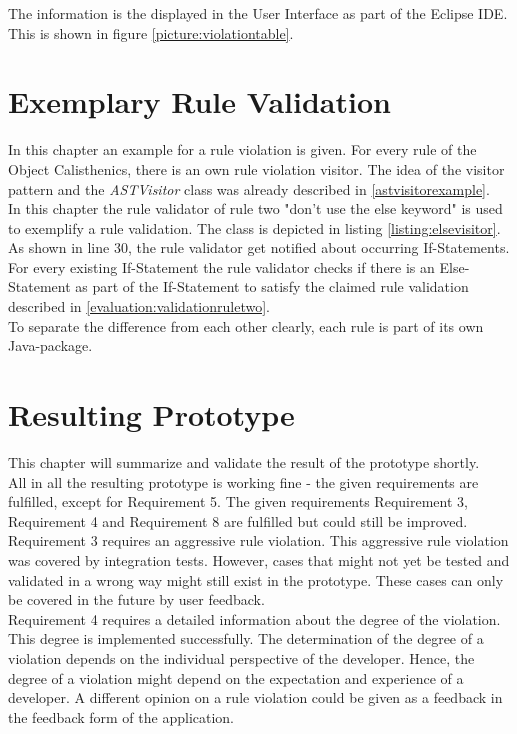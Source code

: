 The information is the displayed in the User Interface as part of the Eclipse \ac{IDE}. This is shown in figure \ref{picture:violationtable}.

\section{Exemplary Rule Validation}
\label{p:example}
In this chapter an example for a rule violation is given. For every rule of the Object Calisthenics, there is an own rule violation visitor. The idea of the visitor pattern and the \textit{ASTVisitor} class was already described in \ref{astvisitorexample}. 
\\

In this chapter the rule validator of rule two "don't use the else keyword" is used to exemplify a rule validation. The class is depicted in listing \ref{listing:elsevisitor}.
\\

As shown in line 30, the rule validator get notified about occurring If-Statements. For every existing If-Statement the rule validator checks if there is an Else-Statement as part of the If-Statement to satisfy the claimed rule validation described in \ref{evaluation:validationruletwo}. 
\\

To separate the difference from each other clearly, each rule is part of its own Java-package. 

\section{Resulting Prototype}
\label{p:result}
This chapter will summarize and validate the result of the prototype shortly. 
\\

All in all the resulting prototype is working fine - the given requirements are fulfilled, except for Requirement 5. The given requirements Requirement 3, Requirement 4 and Requirement 8 are fulfilled but could still be improved.
\\

Requirement 3 requires an aggressive rule violation. This aggressive rule violation was covered by integration tests. However, cases that might not yet be tested and validated in a wrong way might still exist in the prototype. These cases can only be covered in the future by user feedback.
\\

Requirement 4 requires a detailed information about the degree of the violation. This degree is implemented successfully. The determination of the degree of a violation depends on the individual perspective of the developer. Hence, the degree of a violation might depend on the expectation and experience of a developer. A different opinion on a rule violation could be given as a feedback in the feedback form of the application.
\\

